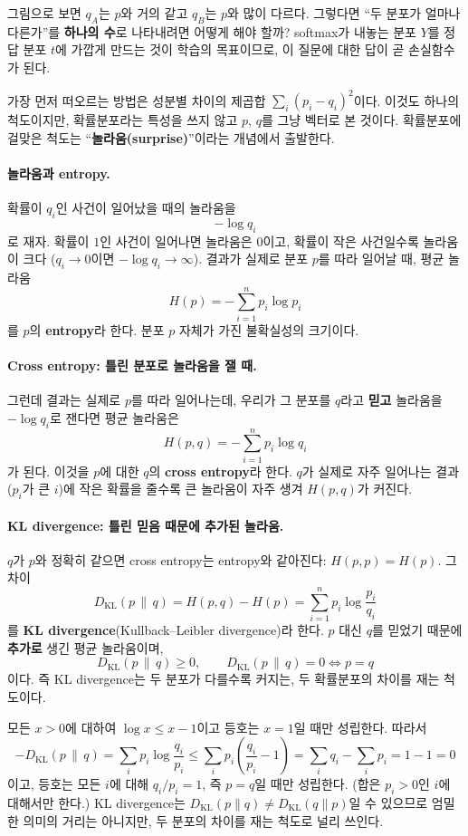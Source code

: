 \documentclass[11pt,a4paper]{article}
\begin{document}
그림으로 보면 $q_A$는 $p$와 거의 같고 $q_B$는 $p$와 많이 다르다.
그렇다면 ``두 분포가 얼마나 다른가''를 \textbf{하나의 수}로 나타내려면 어떻게 해야 할까?
softmax가 내놓는 분포 $Y$를 정답 분포 $t$에 가깝게 만드는 것이 학습의 목표이므로,
이 질문에 대한 답이 곧 손실함수가 된다.

가장 먼저 떠오르는 방법은 성분별 차이의 제곱합 $\sum_i(p_i-q_i)^2$이다.
이것도 하나의 척도이지만, 확률분포라는 특성을 쓰지 않고 $p$, $q$를 그냥 벡터로 본 것이다.
확률분포에 걸맞은 척도는 ``\textbf{놀라움(surprise)}''이라는 개념에서 출발한다.

\paragraph{놀라움과 entropy.}
확률이 $q_i$인 사건이 일어났을 때의 놀라움을
\[
-\log q_i
\]
로 재자. 확률이 $1$인 사건이 일어나면 놀라움은 $0$이고,
확률이 작은 사건일수록 놀라움이 크다 ($q_i\to0$이면 $-\log q_i\to\infty$).
결과가 실제로 분포 $p$를 따라 일어날 때, 평균 놀라움
\[
H(p)=-\sum_{i=1}^{n}p_i\log p_i
\]
를 $p$의 \textbf{entropy}라 한다. 분포 $p$ 자체가 가진 불확실성의 크기이다.

\paragraph{Cross entropy: 틀린 분포로 놀라움을 잴 때.}
그런데 결과는 실제로 $p$를 따라 일어나는데,
우리가 그 분포를 $q$라고 \textbf{믿고} 놀라움을 $-\log q_i$로 잰다면 평균 놀라움은
\[
H(p,q)=-\sum_{i=1}^{n}p_i\log q_i
\]
가 된다. 이것을 $p$에 대한 $q$의 \textbf{cross entropy}라 한다.
$q$가 실제로 자주 일어나는 결과($p_i$가 큰 $i$)에 작은 확률을 줄수록 큰 놀라움이 자주 생겨
$H(p,q)$가 커진다.

\paragraph{KL divergence: 틀린 믿음 때문에 추가된 놀라움.}
$q$가 $p$와 정확히 같으면 cross entropy는 entropy와 같아진다: $H(p,p)=H(p)$.
그 차이
\[
\boxed{
D_{\mathrm{KL}}(p\,\|\,q)=H(p,q)-H(p)=\sum_{i=1}^{n}p_i\log\frac{p_i}{q_i}
}
\]
를 \textbf{KL divergence}(Kullback--Leibler divergence)라 한다.
$p$ 대신 $q$를 믿었기 때문에 \textbf{추가로} 생긴 평균 놀라움이며,
\[
D_{\mathrm{KL}}(p\,\|\,q)\ge0,\qquad D_{\mathrm{KL}}(p\,\|\,q)=0\iff p=q
\]
이다. 즉 KL divergence는 두 분포가 다를수록 커지는, 두 확률분포의 차이를 재는 척도이다.

\begin{remarkbox}[$D_{\mathrm{KL}}(p\,\|\,q)\ge0$의 증명]
모든 $x>0$에 대하여 $\log x\le x-1$이고 등호는 $x=1$일 때만 성립한다. 따라서
\[
-D_{\mathrm{KL}}(p\,\|\,q)=\sum_{i}p_i\log\frac{q_i}{p_i}
\le\sum_{i}p_i\left(\frac{q_i}{p_i}-1\right)
=\sum_i q_i-\sum_i p_i=1-1=0
\]
이고, 등호는 모든 $i$에 대해 $q_i/p_i=1$, 즉 $p=q$일 때만 성립한다.
(합은 $p_i>0$인 $i$에 대해서만 한다.)
KL divergence는 $D_{\mathrm{KL}}(p\|q)\ne D_{\mathrm{KL}}(q\|p)$일 수 있으므로
엄밀한 의미의 거리는 아니지만, 두 분포의 차이를 재는 척도로 널리 쓰인다.
\end{remarkbox}
\end{document}
